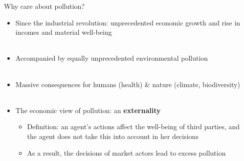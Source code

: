 \documentclass{beamer}
\begin{document}
\begin{frame}[label=w7_why]{Why care about pollution?}
\begin{itemize}
    \item Since the industrial revolution: unprecedented economic growth and rise in incomes and material well-being \\~\\

    \item Accompanied by equally unprecedented environmental pollution \\~\\

    \item Massive consequences for humans (health) \& nature (climate, biodiversity) \\~\\

    \item The economic view of pollution: an \textbf{externality}
        \begin{itemize}
            \item Definition: an agent's actions affect the well-being of third parties, and the agent does not take this into account in her decisions
            \item As a result, the decisions of market actors lead to excess pollution
        \end{itemize}
\end{itemize}
\end{frame}
\end{document}
